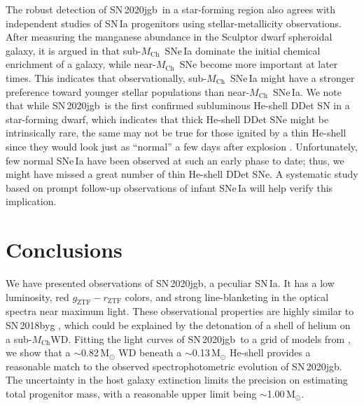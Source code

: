 \documentclass[twocolumn]{aastex631}
\newcommand{\sn}{SN\,2020jgb}
\newcommand{\Mch}{$M_\mathrm{Ch}$}
\newcommand{\Msun}{\mathrm{M_\odot}}
\begin{document}
The robust detection of \sn\ in a star-forming region also agrees with independent studies of SN\,Ia progenitors using stellar-metallicity observations. After measuring the manganese abundance in the Sculptor dwarf spheroidal galaxy, it is argued in \citet{de_los_reyes_manganese_2020} that sub-\Mch\ SNe\,Ia dominate the initial chemical enrichment of a galaxy, while near-\Mch\ SNe become more important at later times. This indicates that observationally, sub-\Mch\ SNe\,Ia might have a stronger preference toward younger stellar populations than near-\Mch\ SNe\,Ia. %
We note that while \sn\ is the first confirmed subluminous He-shell DDet SN in a star-forming dwarf, which indicates that thick He-shell DDet SNe might be intrinsically rare, the same may not be true for those ignited by a thin He-shell since they would look just as  ``normal'' a few days after explosion \citep{Magee_2021}. Unfortunately, few normal SNe\,Ia have been observed at such an early phase to date; thus, we might have missed a great number of thin He-shell DDet SNe. A systematic study based on prompt follow-up observations of infant SNe\,Ia will help verify this implication.

\section{Conclusions} \label{sec:conclusion}
We have presented observations of \sn, a peculiar SN\,Ia. It has a low luminosity, red $g_\mathrm{ZTF}-r_\mathrm{ZTF}$ colors, and strong line-blanketing in the optical spectra near maximum light. These observational properties are highly similar to SN\,2018byg \citep{de_18byg_2019}, which could be explained by the detonation of a shell of helium on a sub-\Mch WD. Fitting the light curves of \sn\ to a grid of models from \citet{polin_observational_2019}, we show that a $\sim$0.82\,$\Msun$ WD beneath a $\sim$0.13\,$\Msun$ He-shell provides a reasonable match to the observed spectrophotometric evolution of \sn. The uncertainty in the host galaxy extinction limits the precision on estimating total progenitor mass, with a reasonable upper limit being $\sim$1.00\,$\Msun$.
\end{document}
